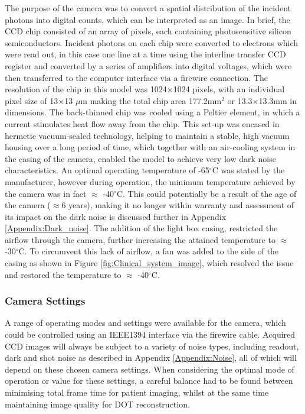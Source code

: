 \documentclass[twoside]{bhamthesis}
\theoremstyle{definition}
\begin{document}
The purpose of the camera was to convert a spatial distribution of the incident photons into digital counts, which can be interpreted as an image. In brief, the CCD chip consisted of an array of pixels, each containing photosensitive silicon semiconductors. Incident photons on each chip were converted to electrons which were read out, in this case one line at a time using the interline transfer CCD register and converted by a series of amplifiers into digital voltages, which were then transferred to the computer interface via a firewire connection. The resolution of the chip in this model was 1024$\times$1024 pixels, with an individual pixel size of 13$\times$13 $\mu$m making the total chip area 177.2mm$^2$ or 13.3$\times$13.3mm in dimensions. The back-thinned chip was cooled using a Peltier element, in which a current stimulates heat flow away from the chip. This set-up was encased in hermetic vacuum-sealed technology, helping to maintain a stable, high vacuum housing over a long period of time, which together with an air-cooling system in the casing of the camera, enabled the model to achieve very low dark noise characteristics. An optimal operating temperature of -65$^\circ$C was stated by the manufacturer, however during operation, the minimum temperature achieved by the camera was in fact $\approx$ -40$^\circ$C. This could potentially be a result of the age of the camera ($\approx$6 years), making it no longer within warranty and assessment of its impact on the dark noise is discussed further in Appendix \ref{Appendix:Dark_noise}. The addition of the light box casing, restricted the airflow through the camera, further increasing the attained temperature to $\approx$ -30$^\circ$C. To circumvent this lack of airflow, a fan was added to the side of the casing as shown in Figure \ref{fig:Clinical_system_image}, which resolved the issue and restored the temperature to $\approx$ -40$^\circ$C. 

\subsubsection{Camera Settings}

A range of operating modes and settings were available for the camera, which could be controlled using an IEEE1394 interface via the firewire cable. Acquired CCD images will always be subject to a variety of noise types, including readout, dark and shot noise as described in Appendix \ref{Appendix:Noise}, all of which will depend on these chosen camera settings. When considering the optimal mode of operation or value for these settings, a careful balance had to be found between minimising total frame time for patient imaging, whilst at the same time maintaining image quality for DOT reconstruction.
\end{document}
